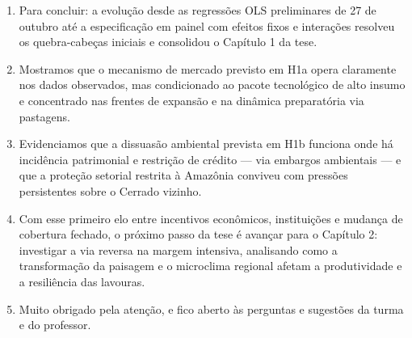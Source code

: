\documentclass[11pt,a4paper]{article}
\begin{document}
\vspace{0.8mm}
\begin{enumerate}[leftmargin=*,label=\textbf{(\arabic*)},itemsep=2.8mm,topsep=1mm]
    \item Para concluir: a evolução desde as regressões OLS preliminares de 27 de outubro até a especificação em painel com efeitos fixos e interações resolveu os quebra-cabeças iniciais e consolidou o Capítulo 1 da tese.
    \item Mostramos que o mecanismo de mercado previsto em H1a opera claramente nos dados observados, mas condicionado ao pacote tecnológico de alto insumo e concentrado nas frentes de expansão e na dinâmica preparatória via pastagens.
    \item Evidenciamos que a dissuasão ambiental prevista em H1b funciona onde há incidência patrimonial e restrição de crédito — via embargos ambientais — e que a proteção setorial restrita à Amazônia conviveu com pressões persistentes sobre o Cerrado vizinho.
    \item Com esse primeiro elo entre incentivos econômicos, instituições e mudança de cobertura fechado, o próximo passo da tese é avançar para o Capítulo 2: investigar a via reversa na margem intensiva, analisando como a transformação da paisagem e o microclima regional afetam a produtividade e a resiliência das lavouras.
    \item Muito obrigado pela atenção, e fico aberto às perguntas e sugestões da turma e do professor.
\end{enumerate}

\newpage
\end{document}
